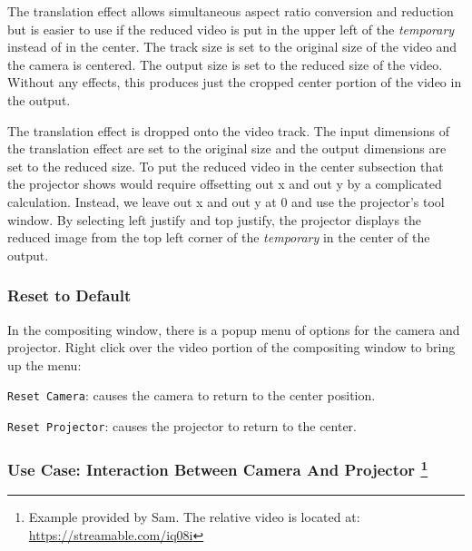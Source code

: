 The translation effect allows simultaneous aspect ratio conversion and reduction but is easier to use if the reduced video is put in the upper left of the \textit{temporary} instead of in the center. 
The track size is set to the original size of the video and the camera is centered. 
The output size is set to the reduced size of the video. 
Without any effects, this produces just the cropped center portion of the video in the output.

The translation effect is dropped onto the video track. The input dimensions of the translation effect are set to the original size and the output dimensions are set to the reduced size. 
To put the reduced video in the center subsection that the projector shows would require offsetting out x and out y by a complicated calculation. 
Instead, we leave out x and out y at 0 and use the projector's tool window. 
By selecting left justify and top justify, the projector displays the reduced image from the top left corner of the \textit{temporary} in the center of the output.

\subsubsection*{Reset to Default}%
\label{ssub:reset_default}

In the compositing window, there is a popup menu of options for the camera and projector. Right click over the video portion of the compositing window to bring up the menu:

\texttt{Reset Camera}: causes the camera to return to the center position.
    	
\texttt{Reset Projector}: causes the projector to return to the center.

\subsubsection*{Use Case: Interaction Between Camera And Projector \protect\footnote{Example provided by Sam. The relative video is located at: \url{https://streamable.com/iq08i}}}%
\label{ssub:use_case_interaction_camera_projector}

